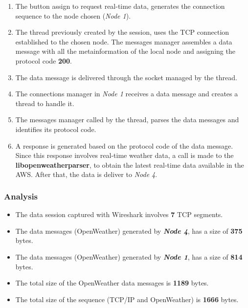 \begin{enumerate}

\item The button assign to request real-time data, generates the connection sequence to the node chosen (\emph{Node 1}).

\item The thread previously created by the session, uses the \gls{TCP} connection established  to the chosen node. The messages manager assembles a data message with all the metainformation of the local node and assigning the protocol code \textbf{200}.

\item The data message is delivered through the socket managed by the thread.

\item The connections manager in \emph{Node 1} receives a data message and creates a thread to handle it.

\item The messages manager called by the thread, parses the data messages and identifies its protocol code.

\item A response is generated based on the protocol code of the data message. Since this response involves real-time weather data, a call is made to the \textbf{libopenweatherparser}, to obtain the latest real-time data available in the \gls{AWS}. After that, the data is deliver to \emph{Node 4}.

\end{enumerate}


\subsubsection{Analysis}

\begin{itemize}
\item The data session captured with Wireshark involves \textbf{7} \gls{TCP} segments.
\item The data messages (OpenWeather) generated by \textbf{\emph{Node 4}}, has a size of \textbf{375} bytes.
\item The data messages (OpenWeather) generated by \textbf{\emph{Node 1}}, has a size of \textbf{814} bytes.
\item The total size of the OpenWeather data messages is \textbf{1189} bytes.
\item The total size of the sequence (\gls{TCP}/\gls{IP} and OpenWeather) is \textbf{1666} bytes. 
\end{itemize}
 
